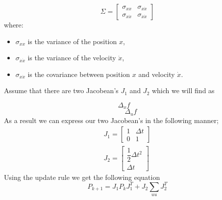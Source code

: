 \documentclass[answers]{exam}
\begin{document}
\begin{questions}
\begin{parts}
\begin{solution}
            \[
                \Sigma = \begin{bmatrix}
                    \sigma_{xx}       & \sigma_{x\dot{x}}       \\
                    \sigma_{x\dot{x}} & \sigma_{\dot{x}\dot{x}}
                \end{bmatrix}
            \]
            where:
            \begin{itemize}
                \item \( \sigma_{xx} \) is the variance of the position \( x \),
                \item \( \sigma_{\dot{x}\dot{x}} \) is the variance of the velocity \( \dot{x} \),
                \item \( \sigma_{x\dot{x}} \) is the covariance between position \( x \) and velocity \( \dot{x} \).
            \end{itemize}

            Assume that there are two Jacobean's $J_1$ and $J_2$ which we will find as

            \begin{equation}
                \Delta_{x} f \quad
            \end{equation}
            \begin{equation}
                \quad \Delta_{u} f
            \end{equation}
            As a result we can express our two Jacobean's in the following manner;
            \begin{align*}
                J_1 = \begin{bmatrix}
                          1 & \Delta t \\
                          0 & 1
                      \end{bmatrix} \\
                J_2 = \begin{bmatrix}
                          \dfrac{1}{2} \Delta t^2 \\
                          \Delta t
                      \end{bmatrix}
            \end{align*}
            Using the update rule we get the following equation
            \begin{equation}
                P_{k+1} = J_1 P_k J_1^T + J_2 \sum_{uu} J_2^T
            \end{equation}


\end{solution}
\end{parts}
\end{questions}
\end{document}
